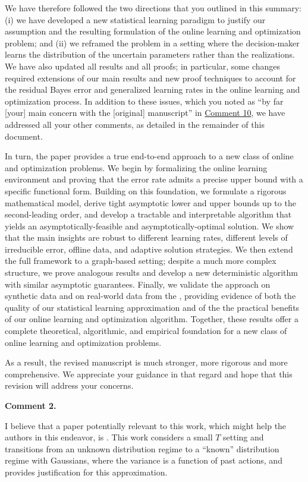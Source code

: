 \documentclass[11pt]{article}
\begin{document}
We have therefore followed the two directions that you outlined in this summary: (i) we have developed a new statistical learning paradigm to justify our assumption and the resulting formulation of the online learning and optimization problem; and (ii) we reframed the problem in a setting where the decision-maker learns the distribution of the uncertain parameters rather than the realizations. We have also updated all results and all proofs; in particular, some changes required extensions of our main results and new proof techniques to account for the residual Bayes error and generalized learning rates in the online learning and optimization process. In addition to these issues, which you noted as ``by far [your] main concern with the [original] manuscript'' in \hyperref[R1:10]{\color{blue}Comment 10}, we have addressed all your other comments, as detailed in the remainder of this document.

In turn, the paper provides a true end-to-end approach to a new class of online and optimization problems. We begin by formalizing the online learning environment and proving that the error rate admits a precise upper bound with a specific functional form. Building on this foundation, we formulate a rigorous mathematical model, derive tight asymptotic lower and upper bounds up to the second-leading order, and develop a tractable and interpretable algorithm that yields an asymptotically-feasible and asymptotically-optimal solution. We show that the main insights are robust to different learning rates, different levels of irreducible error, offline data, and adaptive solution strategies. We then extend the full framework to a graph-based setting; despite a much more complex structure, we prove analogous results and develop a new deterministic algorithm with similar asymptotic guarantees. Finally, we validate the approach on synthetic data and on real-world data from the \cite{UCI}, providing evidence of both the quality of our statistical learning approximation and of the the practical benefits of our online learning and optimization algorithm. Together, these results offer a complete theoretical, algorithmic, and empirical foundation for a new class of online learning and optimization problems.

As a result, the revised manuscript is much stronger, more rigorous and more comprehensive. We appreciate your guidance in that regard and hope that this revision will address your concerns.

\begin{commentBox}
\textbf{Comment 2.}\label{R1:2}

    I believe that a paper potentially relevant to this work, which might help the authors in this endeavor, is \citep{che2023adaptive}. This work considers a small $T$ setting and transitions from an unknown distribution regime to a “known” distribution regime with Gaussians, where the variance is a function of past actions, and provides justification for this approximation.
\end{commentBox}
\end{document}
